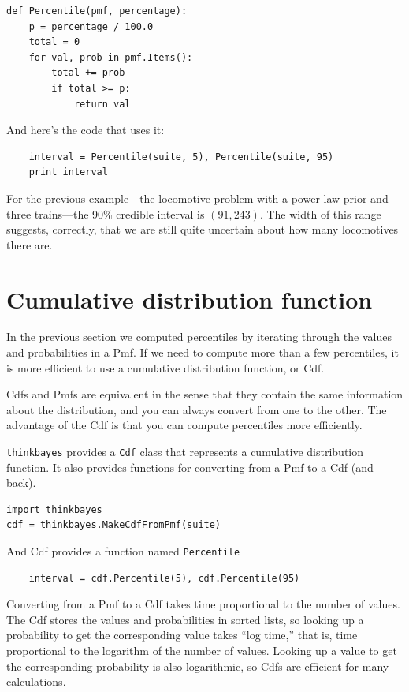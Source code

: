\documentclass[12pt]{book}
\begin{document}
\begin{verbatim}
def Percentile(pmf, percentage):
    p = percentage / 100.0
    total = 0
    for val, prob in pmf.Items():
        total += prob
        if total >= p:
            return val    
\end{verbatim}

And here's the code that uses it:

\begin{verbatim}
    interval = Percentile(suite, 5), Percentile(suite, 95)
    print interval
\end{verbatim}

For the previous example---the locomotive problem with a power law prior
and three trains---the 90\% credible interval is $(91, 243)$.  The
width of this range suggests, correctly, that we are still quite
uncertain about how many locomotives there are.


\section{Cumulative distribution function}

In the previous section we computed percentiles by iterating through
the values and probabilities in a Pmf.  If we need to compute more
than a few percentiles, it is more efficient to use a cumulative
distribution function, or Cdf.

Cdfs and Pmfs are equivalent in the sense that they contain the
same information about the distribution, and you can always convert
from one to the other.  The advantage of the Cdf is that you can
compute percentiles more efficiently.

{\tt thinkbayes} provides a {\tt Cdf} class that represents a
cumulative distribution function.  It also provides functions for
converting from a Pmf to a Cdf (and back). 

\begin{verbatim}
import thinkbayes
cdf = thinkbayes.MakeCdfFromPmf(suite)
\end{verbatim}

And Cdf provides a function named \verb"Percentile"

\begin{verbatim}
    interval = cdf.Percentile(5), cdf.Percentile(95)
\end{verbatim}

Converting from a Pmf to a Cdf takes time proportional to the number
of values.  The Cdf stores the values and probabilities in sorted
lists, so looking up a probability to get the corresponding value
takes ``log time,'' that is, time proportional to the logarithm of the
number of values.  Looking up a value to get the corresponding
probability is also logarithmic, so Cdfs are efficient for many
calculations.
\end{document}
